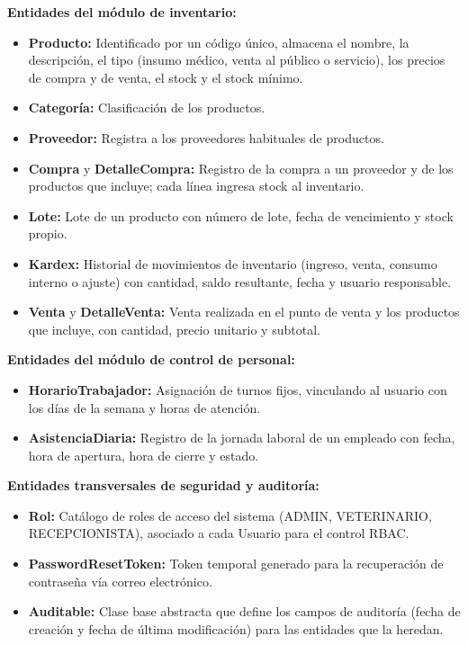 \documentclass[11pt,a4paper]{report}
\begin{document}
\textbf{Entidades del módulo de inventario:}
\begin{itemize}
\item \textbf{Producto:} Identificado por un código único, almacena el nombre, la descripción, el tipo (insumo médico, venta al público o servicio), los precios de compra y de venta, el stock y el stock mínimo.
\item \textbf{Categoría:} Clasificación de los productos.
\item \textbf{Proveedor:} Registra a los proveedores habituales de productos.
\item \textbf{Compra} y \textbf{DetalleCompra:} Registro de la compra a un proveedor y de los productos que incluye; cada línea ingresa stock al inventario.
\item \textbf{Lote:} Lote de un producto con número de lote, fecha de vencimiento y stock propio.
\item \textbf{Kardex:} Historial de movimientos de inventario (ingreso, venta, consumo interno o ajuste) con cantidad, saldo resultante, fecha y usuario responsable.
\item \textbf{Venta} y \textbf{DetalleVenta:} Venta realizada en el punto de venta y los productos que incluye, con cantidad, precio unitario y subtotal.
\end{itemize}

\textbf{Entidades del módulo de control de personal:}
\begin{itemize}
\item \textbf{HorarioTrabajador:} Asignación de turnos fijos, vinculando al usuario con los días de la semana y horas de atención.
\item \textbf{AsistenciaDiaria:} Registro de la jornada laboral de un empleado con fecha, hora de apertura, hora de cierre y estado.
\end{itemize}

\textbf{Entidades transversales de seguridad y auditoría:}
\begin{itemize}
\item \textbf{Rol:} Catálogo de roles de acceso del sistema (ADMIN, VETERINARIO, RECEPCIONISTA), asociado a cada Usuario para el control RBAC.
\item \textbf{PasswordResetToken:} Token temporal generado para la recuperación de contraseña vía correo electrónico.
\item \textbf{Auditable:} Clase base abstracta que define los campos de auditoría (fecha de creación y fecha de última modificación) para las entidades que la heredan.
\end{itemize}
\end{document}
